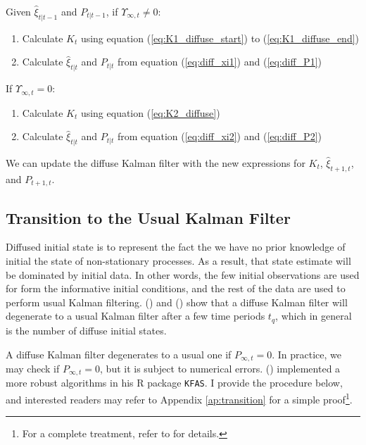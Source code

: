 \documentclass[10pt]{article}
\newenvironment{boenumerate}
    {\begin{enumerate}\renewcommand\labelenumi{\textbf\theenumi}}
    {\end{enumerate}}
\numberwithin{equation}{section}
\begin{document}
Given $\hat{\xi}_{t|t-1}$ and $P_{t|t-1}$, if $\Upsilon_{\infty,t}\neq 0$:
\begin{boenumerate}
    \item Calculate $K_t$ using equation (\ref{eq:K1_diffuse_start}) to (\ref{eq:K1_diffuse_end})
    \item Calculate $\hat{\xi}_{t|t}$ and $P_{t|t}$ from equation (\ref{eq:diff_xi1}) and (\ref{eq:diff_P1})
\end{boenumerate}

If $\Upsilon_{\infty,t}=0$:
\begin{boenumerate}
    \item Calculate $K_t$ using equation (\ref{eq:K2_diffuse})
    \item Calculate $\hat{\xi}_{t|t}$ and $P_{t|t}$ from equation (\ref{eq:diff_xi2}) and (\ref{eq:diff_P2})
\end{boenumerate}

We can update the diffuse Kalman filter with the new expressions for $K_t$, $\hat{\xi}_{t+1,t}$, and $P_{t+1,t}$.

\subsection{Transition to the Usual Kalman Filter}
Diffused initial state is to represent the fact the we have no prior knowledge of initial the state of non-stationary processes. As a result, that state estimate will be dominated by initial data. In other words, the few initial observations are used for form the informative initial conditions, and the rest of the data are used to perform usual Kalman filtering. (\cite{dejong_1991}) and (\cite{durbin_koopman_2003}) show that a diffuse Kalman filter will degenerate to a usual Kalman filter after a few time periods $t_q$, which in general is the number of diffuse initial states. 

A diffuse Kalman filter degenerates to a usual one if $P_{\infty,t}=0$. In practice, we may check if $P_{\infty,t}=0$, but it is subject to numerical errors. (\cite{helske_2016}) implemented a more robust algorithms in his R package \texttt{KFAS}. I provide the procedure below, and interested readers may refer to Appendix \ref{ap:transition} for a simple proof\footnote{For a complete treatment, refer to \cite{koopman_1997} for details.}. 
\end{document}
